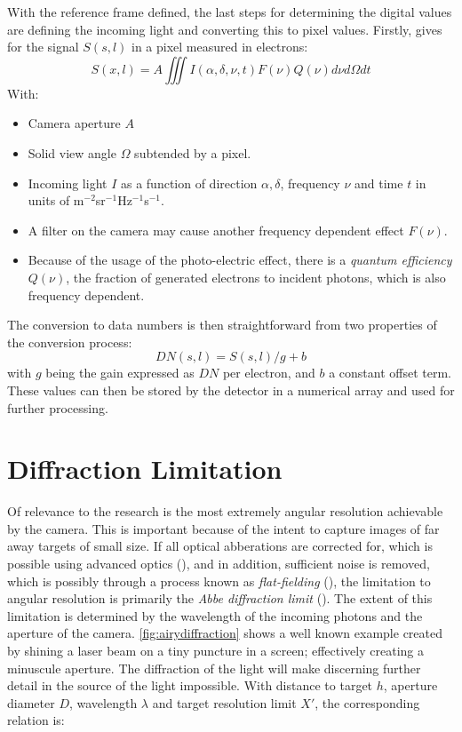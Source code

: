 With the reference frame defined, the last steps for determining the digital values are defining the incoming light and converting this to pixel values. Firstly, \cite{OpNav} gives for the signal $S(s, l)$ in a pixel measured in electrons:
\begin{equation}
    S(x,l) = A\iiint I(\alpha, \delta, \nu, t)F(\nu)Q(\nu)d\nu d\Omega dt
    \label{eq:pixelsignal}
\end{equation}
With:
\begin{itemize}
    \item Camera aperture $A$
    \item Solid view angle $\Omega$ subtended by a pixel.
    \item Incoming light $I$ as a function of direction $\alpha, \delta$, frequency $\nu$ and time $t$ in units of m$^{-2}$sr$^{-1}$Hz$^{-1}$s$^{-1}$.
    \item A filter on the camera may cause another frequency dependent effect $F(\nu)$.
    \item Because of the usage of the photo-electric effect, there is a \textit{quantum efficiency} $Q(\nu)$, the fraction of generated electrons to incident photons, which is also frequency dependent.
\end{itemize}
The conversion to data numbers is then straightforward from two properties of the conversion process:
\begin{equation}
    DN(s, l) = S(s, l)/g + b
\end{equation}
with $g$ being the gain expressed as $DN$ per electron, and $b$ a constant offset term. These values can then be stored by the detector in a numerical array and used for further processing.
\section{Diffraction Limitation}
\label{sec:opticslimitations}
Of relevance to the research is the most extremely angular resolution achievable by the camera. This is important because of the intent to capture images of far away targets of small size. If all optical abberations are corrected for, which is possible using advanced optics (\cite{SMAD}), and in addition, sufficient noise is removed, which is possibly through a process known as \textit{flat-fielding} (\cite{OpNav}), the limitation to angular resolution is primarily the \textit{Abbe diffraction limit} (\cite{diffractionlimit}). The extent of this limitation is determined by the wavelength of the incoming photons and the aperture of the camera. \autoref{fig:airydiffraction} shows a well known example created by shining a laser beam on a tiny puncture in a screen; effectively creating a minuscule aperture. The diffraction of the light will make discerning further detail in the source of the light impossible. With distance to target $h$, aperture diameter $D$, wavelength $\lambda$ and target resolution limit $X'$, the corresponding relation is:

